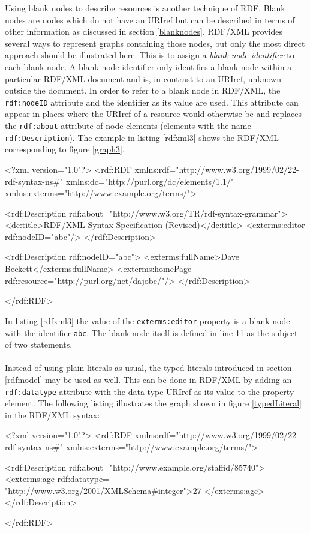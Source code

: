 \documentclass[11pt,a4paper,headsepline, bibtotoc]{scrreprt}
\begin{document}
Using blank nodes to describe resources is another technique of RDF. Blank nodes are nodes which do not have an URIref but can be described in terms of other information as discussed in section \ref{blanknodes}. RDF/XML provides several ways to represent graphs containing those nodes, but only the most direct approach should be illustrated here. This is to assign a \textit{blank node identifier} to each blank node. A blank node identifier only identifies a blank node within a particular RDF/XML document and is, in contrast to an URIref, unknown outside the document. In order to refer to a blank node in RDF/XML, the \texttt{rdf:nodeID} attribute and the identifier as its value are used. This attribute can appear in places where the URIref of a resource would otherwise be and replaces the \texttt{rdf:about} attribute of node elements (elements with the name \texttt{rdf:Description}). The example in listing \ref{rdfxml3} shows the RDF/XML corresponding to figure \ref{graph3}.
\begin{xmlnb}[caption={Blank Nodes in RDF/XML},label={rdfxml3}]
<?xml version="1.0"?>
<rdf:RDF xmlns:rdf="http://www.w3.org/1999/02/22-rdf-syntax-ns#"
            xmlns:dc="http://purl.org/dc/elements/1.1/"
            xmlns:exterms="http://www.example.org/terms/">

  <rdf:Description rdf:about="http://www.w3.org/TR/rdf-syntax-grammar">
    <dc:title>RDF/XML Syntax Specification (Revised)</dc:title>
    <exterms:editor rdf:nodeID="abc"/>
  </rdf:Description>

  <rdf:Description rdf:nodeID="abc">
    <exterms:fullName>Dave Beckett</exterms:fullName>
    <exterms:homePage rdf:resource="http://purl.org/net/dajobe/"/>
  </rdf:Description>

</rdf:RDF>
\end{xmlnb}
In listing \ref{rdfxml3} the value of the \texttt{exterms:editor} property is a blank node with the identifier \texttt{abc}. The blank node itself is defined in line 11 as the subject of two statements.\\
\\
Instead of using  plain literals as usual, the typed literals introduced in section \ref{rdfmodel} may be used as well. This can be done in RDF/XML by adding an \texttt{rdf:datatype} attribute with the data type URIref as its value to the property element. The following listing illustrates the graph shown in figure \ref{typedLiteral} in the RDF/XML syntax:
\begin{xmlnb}[caption={Typed Literal in RDF/XML},label={rdfxml4}]
<?xml version="1.0"?>
<rdf:RDF xmlns:rdf="http://www.w3.org/1999/02/22-rdf-syntax-ns#"
            xmlns:exterms="http://www.example.org/terms/">

  <rdf:Description rdf:about="http://www.example.org/staffid/85740">
    <exterms:age rdf:datatype=
      "http://www.w3.org/2001/XMLSchema#integer">27
    </exterms:age>
  </rdf:Description>

</rdf:RDF>
\end{xmlnb}
\end{document}
